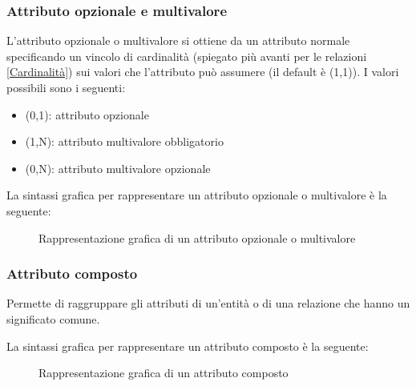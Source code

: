 \documentclass[a4paper]{article}
\begin{document}
\subsubsection{Attributo opzionale e multivalore}
L'attributo opzionale o multivalore si ottiene da un attributo normale specificando un vincolo
di cardinalità (spiegato più avanti per le relazioni \ref{Cardinalità}) sui valori che
l'attributo può assumere (il default è (1,1)). I valori possibili sono i seguenti:
\begin{itemize}
  \item (0,1): attributo opzionale
  \item (1,N): attributo multivalore obbligatorio
  \item (0,N): attributo multivalore opzionale
\end{itemize}

\vspace{1em}
\noindent
La sintassi grafica per rappresentare un attributo opzionale o multivalore è la seguente:
\begin{figure}[H]
  \centering
  \caption{Rappresentazione grafica di un attributo opzionale o multivalore}
\end{figure}

\subsubsection{Attributo composto}
Permette di raggruppare gli attributi di un'entità o di una relazione che hanno un significato
comune.

\vspace{1em}
\noindent
La sintassi grafica per rappresentare un attributo composto è la seguente:
\begin{figure}[H]
  \centering
  \caption{Rappresentazione grafica di un attributo composto}
\end{figure}
\end{document}
